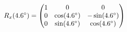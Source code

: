 \documentclass[preview]{standalone}
\begin{document}
\begin{align*}
\special{dvisvgm:raw <g id='unique000'>}R_x(4.6^\circ) = \begin{pmatrix} 1 & 0 & 0 \\ 0 & \cos(4.6^\circ) & -\sin(4.6^\circ) \\ 0 & \sin(4.6^\circ) & \cos(4.6^\circ) \end{pmatrix}\special{dvisvgm:raw </g>}
\end{align*}
\end{document}
